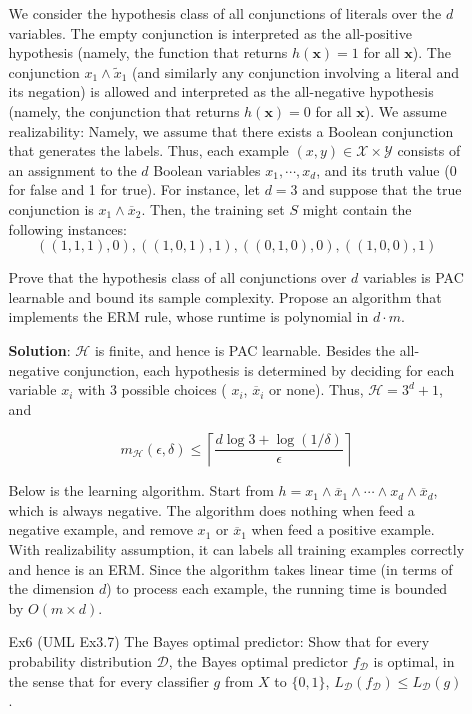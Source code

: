 \documentclass{article}
\begin{document}
\begin{itemize}
\begin{itemize}
	We consider the hypothesis class of all conjunctions of literals over the $d$ variables. The empty conjunction is interpreted as the all-positive hypothesis (namely, the function that returns $h(\mathbf{x}) = 1$ for all $\mathbf{x}$). The conjunction $x_1 \wedge \tilde{x}_1$ (and similarly any conjunction involving a literal and its negation) is allowed and interpreted as the all-negative hypothesis (namely, the conjunction that returns $h(\mathbf{x}) = 0$ for all $\mathbf{x}$). We assume realizability: Namely, we assume that there exists a Boolean conjunction that generates the labels. Thus, each example $(x, y)\in\mathcal{X}\times\mathcal{Y}$ consists of an assignment to the $d$ Boolean variables $x_1, \cdots, x_d$, and its truth value (0 for false and 1 for true). For instance, let $d = 3$ and suppose that the true conjunction is $x_1 \wedge \overline{x}_2$. Then, the training set $S$ might contain the following instances:
	\begin{equation*}
	((1, 1, 1), 0), ((1, 0, 1), 1), ((0, 1, 0), 0), ((1, 0, 0), 1)
	\end{equation*}

	Prove that the hypothesis class of all conjunctions over $d$ variables is PAC learnable and bound its sample complexity. Propose an algorithm that implements the ERM rule, whose runtime is polynomial in $d\cdot m$.

\item[] \textbf{Solution}: $\mathcal{H}$ is finite, and hence is PAC learnable. Besides the all-negative conjunction, each hypothesis is determined by deciding for each variable $x_i$ with 3 possible choices ( $x_i$,  $\overline{x}_i$ or none). Thus,  $\mathcal{H}=3^d+1$, and 

	\begin{equation*}
	m_\mathcal{H}(\epsilon, \delta) \leq \left\lceil \frac{d\log 3 + \log(1/\delta)}{\epsilon} \right\rceil
	\end{equation*}
	
	Below is the learning algorithm. Start from $h=x_1\wedge\overline{x}_1\wedge\cdots\wedge x_d\wedge\overline{x}_d$, which is always negative. The algorithm does nothing when feed a negative example, and remove $x_1$ or $\overline{x}_1$ when feed a positive example. With realizability assumption, it can labels all training examples correctly and hence is an ERM. Since the algorithm takes linear time (in terms of the dimension $d$) to process each example, the running time is bounded by $O(m\times d)$.
	
\item[Ex6] (UML Ex3.7) The Bayes optimal predictor: Show that for every probability distribution $\mathcal{D}$, the Bayes optimal predictor $f_\mathcal{D}$ is optimal, in the sense that for every classifier $g$ from $X$ to $\{0, 1\}$, $L_\mathcal{D}(f_{\mathcal{D}}) \leq L_\mathcal{D}(g)$.


\end{itemize}
\end{itemize}
\end{document}
